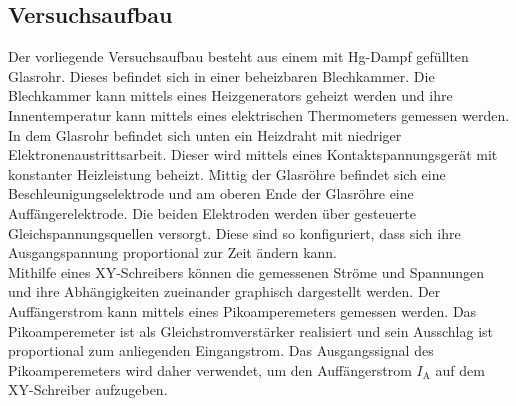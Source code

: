 \subsection{Versuchsaufbau}
\label{sec:Versuchsaufbau}
Der vorliegende Versuchsaufbau besteht aus einem mit Hg-Dampf gefüllten Glasrohr.
Dieses befindet sich in einer beheizbaren Blechkammer. Die Blechkammer kann mittels eines Heizgenerators geheizt werden und ihre Innentemperatur kann mittels eines elektrischen Thermometers gemessen werden.\\
In dem Glasrohr befindet sich unten ein Heizdraht mit niedriger Elektronenaustrittsarbeit. Dieser wird mittels eines Kontaktspannungsgerät mit konstanter Heizleistung beheizt. Mittig der Glasröhre befindet sich eine Beschleunigungselektrode und am oberen Ende der Glasröhre eine Auffängerelektrode.
Die beiden Elektroden werden über gesteuerte Gleichspannungsquellen versorgt. Diese sind so konfiguriert, dass sich ihre Ausgangspannung proportional zur Zeit ändern kann.\\
Mithilfe eines XY-Schreibers können die gemessenen Ströme und Spannungen und ihre Abhängigkeiten zueinander graphisch dargestellt werden.
Der Auffängerstrom kann mittels eines Pikoamperemeters gemessen werden.
Das Pikoamperemeter ist als Gleichstromverstärker realisiert und sein Ausschlag ist proportional zum anliegenden Eingangstrom. Das Ausgangssignal des Pikoamperemeters wird daher verwendet, um den Auffängerstrom $I_\mathrm{A}$ auf dem XY-Schreiber aufzugeben.
